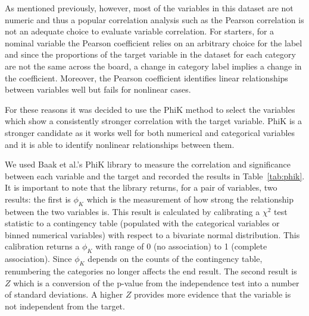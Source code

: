 \documentclass{ieeeaccess}
\begin{document}
As mentioned previously, however, most of the variables in this dataset are not numeric and thus a popular correlation analysis such as the Pearson correlation is not an adequate choice to evaluate variable correlation. For starters, for a nominal variable the Pearson coefficient relies on an arbitrary choice for the label and since the proportions of the target variable in the dataset for each category are not the same across the board, a change in category label implies a change in the coefficient. Moreover, the Pearson coefficient identifies linear relationships between variables well but fails for nonlinear cases.

For these reasons it was decided to use the PhiK method \cite{BAAK2020107043PHIK} to select the variables which show a consistently stronger correlation with the target variable. PhiK is a stronger candidate as it works well for both numerical and categorical variables and it is able to identify nonlinear relationships between them.

We used Baak et al.'s PhiK library to measure the correlation and significance between each variable and the target and recorded the results in Table~\ref{tab:phik}. It is important to note that the library returns, for a pair of variables, two results: the first is $\phi_{K}$ which is the measurement of how strong the relationship between the two variables is. This result is calculated by calibrating a $\chi^2$ test statistic to a contingency table (populated with the categorical variables or binned numerical variables) with respect to a bivariate normal distribution. This calibration returns a $\phi_{K}$ with range of 0 (no association) to 1 (complete association). Since $\phi_{K}$ depends on the counts of the contingency table, renumbering the categories no longer affects the end result. The second result is $Z$ which is a conversion of the p-value from the independence test into a number of standard deviations. A higher $Z$ provides more evidence that the variable is not independent from the target.
\end{document}
